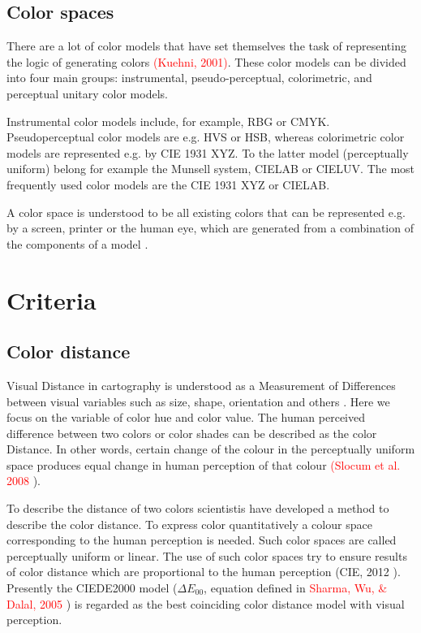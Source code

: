 \subsection{Color spaces}
There are a lot of color models that have set themselves the task of representing the logic of generating colors \textcolor{red}{(Kuehni, 2001)}. These color models can be divided into four main groups: instrumental, pseudo-perceptual, colorimetric, and perceptual unitary color models.

Instrumental color models include, for example, RBG or CMYK. Pseudoperceptual color models are e.g. HVS or HSB, whereas colorimetric color models are represented e.g. by CIE 1931 XYZ. To the latter model (perceptually uniform) belong for example the Munsell system, CIELAB or CIELUV. The most frequently used color models are the CIE 1931 XYZ or CIELAB. 

A color space is understood to be all existing colors that can be represented e.g. by a screen, printer or the human eye, which are generated from a combination of the components of a model \parencite{munsell1915}.

\section{Criteria}

\subsection{Color distance}\label{subsection:distance}
Visual Distance in cartography is understood as a Measurement of Differences between visual variables such as size, shape, orientation and others \parencite{brychtova2015}. Here we focus on the variable of color hue and color value. The human perceived difference between two colors or color shades can be described as the color Distance. In other words, certain change of the colour in the perceptually uniform space produces equal change in human perception of that colour \textcolor{red}{(Slocum et al. 2008} \parencite{brychtova2017}).

To describe the distance of two colors scientistis have developed a method to describe the color distance. To express color quantitatively a colour space corresponding to the human perception is needed. Such color spaces are called perceptually uniform or linear. The use of such color spaces try to ensure results of color distance which are proportional to the human perception (CIE, 2012 \parencite{brychtova2015}). Presently the CIEDE2000 model ($\Delta E_{00}$, equation defined in \textcolor{red}{Sharma, Wu, \& Dalal, 2005} \parencite{brychtova2015}) is regarded as the best coinciding color distance model with visual perception. 
 
